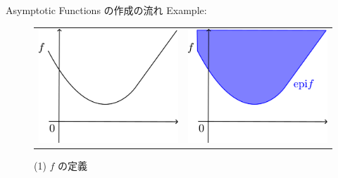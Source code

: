 \documentclass[aspectratio=169, dvipdfmx, 11pt]{beamer} %
\begin{document}
\begin{frame}{Asymptotic Functions の作成の流れ}
  Example:

  \begin{figure}[htbp]
    \begin{tabular}{cc}
      \begin{minipage}[t]{0.45\hsize}
        \centering
        \includegraphics[keepaspectratio, scale=0.07]{figures/asymptotic_function_def/graph_base.eps}
        \caption{(1) $f$ の定義}
        \label{composite}
      \end{minipage} &
      \begin{minipage}[t]{0.45\hsize}
        \centering
        \includegraphics[keepaspectratio, scale=0.07]{figures/asymptotic_function_def/asymptotic_function_epigraph.eps}

\end{minipage}
\end{tabular}
\end{figure}
\end{frame}
\end{document}
